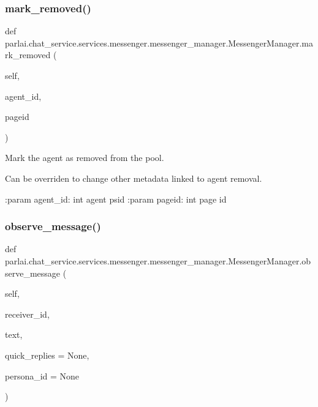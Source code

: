 \subsubsection{\texorpdfstring{mark\+\_\+removed()}{mark\_removed()}}
{\footnotesize\ttfamily def parlai.\+chat\+\_\+service.\+services.\+messenger.\+messenger\+\_\+manager.\+Messenger\+Manager.\+mark\+\_\+removed (\begin{DoxyParamCaption}\item[{}]{self,  }\item[{}]{agent\+\_\+id,  }\item[{}]{pageid }\end{DoxyParamCaption})}

\begin{DoxyVerb}Mark the agent as removed from the pool.

Can be overriden to change other metadata linked to agent removal.

:param agent_id:
    int agent psid
:param pageid:
    int page id
\end{DoxyVerb}
 \mbox{\label{classparlai_1_1chat__service_1_1services_1_1messenger_1_1messenger__manager_1_1MessengerManager_ab951bfae1eeb05f42e9fa215b2d019a7}} 
\subsubsection{\texorpdfstring{observe\+\_\+message()}{observe\_message()}}
{\footnotesize\ttfamily def parlai.\+chat\+\_\+service.\+services.\+messenger.\+messenger\+\_\+manager.\+Messenger\+Manager.\+observe\+\_\+message (\begin{DoxyParamCaption}\item[{}]{self,  }\item[{}]{receiver\+\_\+id,  }\item[{}]{text,  }\item[{}]{quick\+\_\+replies = {\ttfamily None},  }\item[{}]{persona\+\_\+id = {\ttfamily None} }\end{DoxyParamCaption})}

